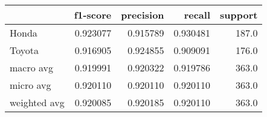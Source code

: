 \begin{tabular}{lrrrr}
\toprule
{} &  f1-score &  precision &    recall &  support \\
\midrule
Honda        &  0.923077 &   0.915789 &  0.930481 &    187.0 \\
Toyota       &  0.916905 &   0.924855 &  0.909091 &    176.0 \\
macro avg    &  0.919991 &   0.920322 &  0.919786 &    363.0 \\
micro avg    &  0.920110 &   0.920110 &  0.920110 &    363.0 \\
weighted avg &  0.920085 &   0.920185 &  0.920110 &    363.0 \\
\bottomrule
\end{tabular}
